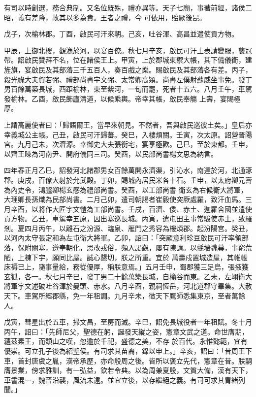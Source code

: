 \begin{pinyinscope}
 有司以時創選，務合典制。又名位既殊，禮亦異等。天子七廟，事著前經，諸侯二昭，義有差降，故其以多為貴。王者之禮，今
 可依用，貽厥後昆。



 戊子，次榆林郡。丁酉，啟民可汗來朝。己亥，吐谷渾、高昌並遣使貢方物。



 甲辰，上御北樓，觀漁於河，以宴百僚。秋七月辛亥，啟民可汗上表請變服，襲冠帶。詔啟民贊拜不名，位在諸侯王上。甲寅，上於郡城東禦大帳，其下備儀衛，建旌旗，宴啟民及其部落三千五百人，奏百戲之樂。賜啟民及其部落各有差。丙子，殺光祿大夫賀若弼、禮部尚書宇文弼、太常卿高熲。尚書左僕射蘇威坐事免。發丁男百餘萬築長城，西距榆林，東至紫河，一旬而罷，死者十五六。八月壬午，車駕發榆林。乙酉，啟民飾廬清道，以候乘輿。帝幸其帳，啟民奉觴
 上壽，宴賜極厚。



 上謂高麗使者曰：「歸語爾王，當早來朝見。不然者，吾與啟民巡彼土矣。」皇后亦幸義城公主帳。己丑，啟民可汗歸蕃。癸巳，入樓煩關。壬寅，次太原。詔營晉陽宮。九月己未，次濟源。幸御史大夫張衡宅，宴享極歡。己巳，至於東都。壬申，以齊王暕為河南尹、開府儀同三司。癸酉，以民部尚書楊文思為納言。



 四年春正月乙巳，詔發河北諸郡男女百餘萬開永濟渠，引沁水，南達於河，北通涿郡。庚戌，百僚大射於允武殿。丁卯，賜城內居民米各十石。壬申，以太府卿元壽為內史令，鴻臚卿楊玄感為禮部尚書。癸酉，以工部尚書
 衛玄為右候衛大將軍，大理卿長孫熾為民部尚書。二月己卯，遣司朝謁者崔毅使突厥處羅，致汗血馬。三月辛酉，以將作大匠宇文愷為工部尚書。壬戌，百濟、倭、赤土、迦羅舍國並遣使貢方物。乙丑，車駕幸五原，因出塞巡長城。丙寅，遣屯田主事常駿使赤土，致羅剎。夏四月丙午，以離石之汾源、臨泉、雁門之秀容為樓煩郡。起汾陽宮。癸丑，以河內太守張定和為左屯衛大將軍。乙卯，詔曰：「突厥意利珍豆啟民可汗率領部落，保附關塞，遵奉朝化，思改戎俗，頻入謁覲，屢有陳請。以氈墻毳幕，事窮荒陋，上棟下宇，願同比屋。誠心懇切，朕之所重。宜於
 萬壽戍置城造屋，其帷帳床褥已上，隨事量給，務從優厚，稱朕意焉。」五月壬申，蜀郡獲三足烏，張掖獲玄狐，各一。秋七月辛巳，發丁男二十餘萬築長城，自榆谷而東。乙未，左翊衛大將軍宇文述破吐谷渾於曼頭、赤水。八月辛酉，親祠恆岳，河北道郡守畢集。大赦天下。車駕所經郡縣，免一年租調。九月辛未，徵天下鷹師悉集東京，至者萬餘人。



 戊寅，彗星出於五車，掃文昌，至房而滅。辛巳，詔免長城役者一年租賦。冬十月丙午，詔曰：「先師尼父，聖德在躬，誕發天縱之姿，憲章文武之道。命世膺期，蘊茲素王，而頹山之嘆，忽逾於千祀，盛德之美，不存
 於百代。永惟懿範，宜有優崇。可立孔子後為紹聖侯。有司求其苗裔，錄以申上。」辛亥，詔曰：「昔周王下車，首封唐虞之胤，漢帝承歷，亦命殷周之後。皆所以褒立先代，憲章在昔。朕嗣膺景業，傍求雅訓，有一弘益，欽若令典。以為周兼夏殷，文質大備，漢有天下，車書混一，魏晉沿襲，風流未遠。並宜立後，以存繼絕之義。有司可求其胄緒列聞。」




\end{pinyinscope}
